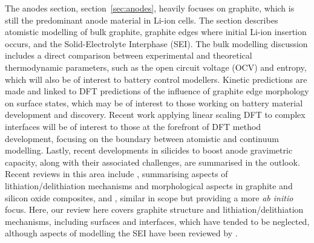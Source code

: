\documentclass[../main.tex]{subfiles}
\begin{document}
The anodes section, section~\ref{sec:anodes}, heavily focuses on graphite, which is still the predominant anode material in Li-ion cells. The section describes atomistic modelling of bulk graphite, graphite edges where initial Li-ion insertion occurs, and the Solid-Electrolyte Interphase (SEI). The bulk modelling discussion includes a direct comparison between experimental and theoretical thermodynamic parameters, such as the open circuit voltage (OCV) and entropy, which will also be of interest to battery control modellers. Kinetic predictions are made and linked to DFT predictions of the influence of graphite edge morphology on surface states, which may be of interest to those working on battery material development and discovery. Recent work applying linear scaling DFT to complex interfaces will be of interest to those at the forefront of DFT method development, focusing on the boundary between atomistic and continuum modelling. Lastly, recent developments in silicides to boost anode gravimetric capacity, along with their associated challenges, are summarised in the outlook. Recent reviews in this area include \citeauthor{asenbauer_success_2020} \cite{asenbauer_success_2020}, summarising aspects of lithiation/delithiation mechanisms and morphological aspects in graphite and silicon oxide composites, and \citeauthor{ZHANG2021147} \cite{ZHANG2021147}, similar in scope but providing a more \textit{ab initio} focus. Here, our review here covers graphite structure and lithiation/delithiation mechanisms, including surfaces and interfaces, which have tended to be neglected, although aspects of modelling the SEI have been reviewed by \citeauthor{Wang2018}. \cite{Wang2018}
\end{document}
